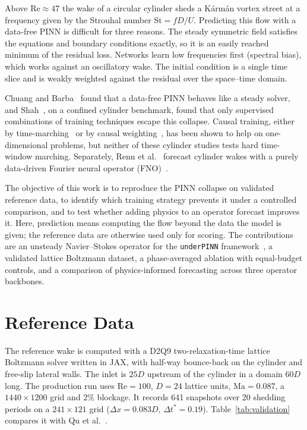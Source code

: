 \documentclass[conference]{IEEEtran}
\newcommand{\Rey}{\mathrm{Re}}
\newcommand{\St}{\mathrm{St}}
\begin{document}
Above $\Rey \approx 47$ the wake of a circular cylinder sheds a K\'arm\'an
vortex street at a frequency given by the Strouhal number $\St = fD/U$.
Predicting this flow with a data-free PINN is difficult for three reasons. The
steady symmetric field satisfies the equations and boundary conditions exactly,
so it is an easily reached minimum of the residual loss. Networks learn low
frequencies first (spectral bias), which works against an oscillatory wake.
The initial condition is a single time slice and is weakly weighted against the
residual over the space--time domain.

Chuang and Barba~\cite{chuang2023} found that a data-free PINN behaves like a
steady solver, and Shah~\cite{shah2026}, on a confined cylinder benchmark,
found that only supervised combinations of training techniques escape this
collapse. Causal training, either by time-marching~\cite{krishnapriyan2021} or
by causal weighting~\cite{wang2024causality}, has been shown to help on
one-dimensional problems, but neither of these cylinder studies tests hard
time-window marching. Separately, Renn et al.~\cite{renn2023} forecast
cylinder wakes with a purely data-driven Fourier neural operator
(FNO)~\cite{li2021fno}.

The objective of this work is to reproduce the PINN collapse on validated
reference data, to identify which training strategy prevents it under a
controlled comparison, and to test whether adding physics to an operator
forecast improves it. Here, prediction means computing the flow beyond the
data the model is given; the reference data are otherwise used only for
scoring. The contributions are an unsteady Navier--Stokes operator for the
\texttt{underPINN} framework~\cite{underpinn}, a validated lattice Boltzmann
dataset, a phase-averaged ablation with equal-budget controls, and a
comparison of physics-informed forecasting across three operator backbones.

\section{Reference Data}
\label{sec:lbm}

The reference wake is computed with a D2Q9 two-relaxation-time lattice
Boltzmann solver written in JAX, with half-way bounce-back on the cylinder and
free-slip lateral walls. The inlet is $25D$ upstream of the cylinder in a
domain $60D$ long. The production run uses $\Rey = 100$, $D = 24$ lattice
units, $\mathrm{Ma} = 0.087$, a $1440 \times 1200$ grid and $2\%$ blockage. It
records 641 snapshots over 20 shedding periods on a $241 \times 121$ grid
($\Delta x = 0.083D$, $\Delta t^{*} = 0.19$). Table~\ref{tab:validation}
compares it with Qu et al.~\cite{qu2013}.
\end{document}
